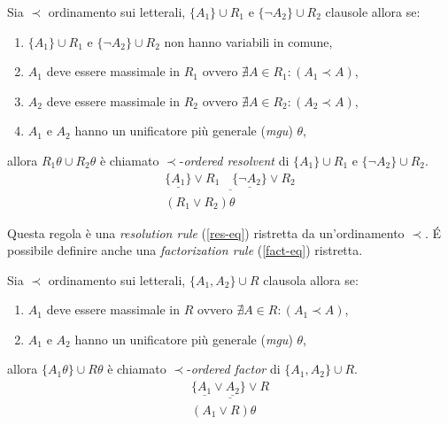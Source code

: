 \begin{definition}
    Sia $\prec$ ordinamento sui letterali, $\{A_1\}\cup R_1$ e $\{\lnot A_2\}\cup R_2$ clausole allora se:
    \begin{enumerate}
        \item $\{A_1\}\cup R_1$ e $\{\lnot A_2\}\cup R_2$ non hanno variabili in comune,
        \item $A_1$ deve essere massimale in $R_1$ ovvero $\nexists A\in R_1 : (A_1 \prec A)$,
        \item $A_2$ deve essere massimale in $R_2$ ovvero $\nexists A\in R_2 : (A_2 \prec A)$,
        \item $A_1$ e $A_2$ hanno un unificatore più generale (\emph{mgu}) $\theta$,
    \end{enumerate}
    allora $R_1\theta \cup R_2\theta$ è chiamato $\prec$-\emph{ordered resolvent} di $\{A_1\}\cup R_1$ e $\{\lnot A_2\}\cup R_2$.
    \begin{equation}
        \begin{gathered}
            \underline{\{\underline{A_1}\} \lor R_1 \quad\{\underline{\lnot A_2}\}\lor R_2}\\
            (R_1 \lor R_2)\theta
        \end{gathered}
    \end{equation}
\end{definition}
Questa regola è una \emph{resolution rule} (\ref{res-eq}) ristretta da un'ordinamento $\prec$. \'E possibile
definire anche una  \emph{factorization rule} (\ref{fact-eq}) ristretta.
\begin{definition}
    Sia $\prec$ ordinamento sui letterali, $\{A_1,A_2\}\cup R$ clausola allora se:
    \begin{enumerate}
        \item $A_1$ deve essere massimale in $R$ ovvero $\nexists A\in R : (A_1 \prec A)$,
        \item $A_1$ e $A_2$ hanno un unificatore più generale (\emph{mgu}) $\theta$,
    \end{enumerate}
    allora $\{A_1\theta\}\cup R\theta$ è chiamato $\prec$-\emph{ordered factor} di $\{A_1,A_2\}\cup R$.
    \begin{equation}
        \begin{gathered}
            \underline{\{\underline{A_1} \lor \underline{A_2}\} \lor R}\\
            (A_1 \lor R)\theta
        \end{gathered}
    \end{equation}
\end{definition}
